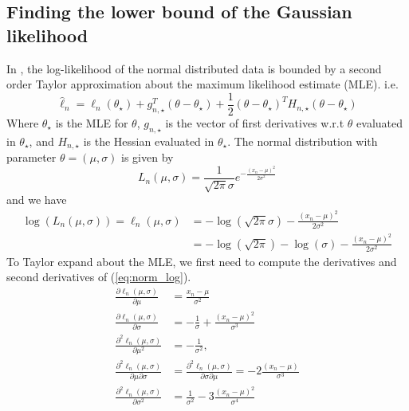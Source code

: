 \documentclass{article}
\theoremstyle{definition}
\begin{document}
\subsection{Finding the lower bound of the Gaussian likelihood}
In \cite{Bardenet:1}, the log-likelihood of the normal distributed data is bounded by a second order Taylor approximation about the maximum likelihood estimate (MLE). i.e. 
\begin{equation}
  \hat{\ell}_n = \ell_n(\theta_{\star} ) + g_{n,\star}^T\left(\theta - \theta_{\star}\right) + \frac{1}{2}\left(\theta - \theta_{\star}\right)^T H_{n, \star}\left(\theta - \theta_{\star}\right)
\end{equation}
Where $\theta_{\star}$ is the MLE for $\theta$, $g_{n,\star}$ is the vector of first derivatives w.r.t $\theta$ evaluated in $\theta_{\star}$, and $H_{n, \star}$ is the Hessian evaluated in $\theta_{\star}$. The normal distribution with parameter $\theta = (\mu, \sigma)$  is given by 
\begin{equation}
    L_n(\mu, \sigma) = \frac{1}{\sqrt{2\pi}\sigma}e^{-\frac{\left(x_n-\mu\right)^2}{2\sigma^2}}
\end{equation}
and we have 
\begin{equation}\label{eq:norm_log}
\begin{split}
    \log\left(L_n(\mu, \sigma)\right) = \ell_n(\mu, \sigma) &= -\log\left(\sqrt{2\pi}\sigma\right) - \frac{\left(x_n - \mu\right)^2}{2\sigma^2} \\
    &= - \log\left(\sqrt{2\pi}\right) - \log\left(\sigma\right) - \frac{\left(x_n-\mu\right)^2}{2\sigma^2}
\end{split}
\end{equation}
To Taylor expand about the MLE, we first need to compute the derivatives and second derivatives of (\ref{eq:norm_log}). 
\begin{equation}
    \begin{split}
    \frac{\partial \ell_n\left(\mu, \sigma\right)}{\partial \mu} &= \frac{x_n - \mu}{\sigma^2} 
    \\ \frac{\partial \ell_n\left(\mu, \sigma\right)}{\partial \sigma} &= -\frac{1}{\sigma}  + \frac{\left(x_n - \mu \right)^2}{\sigma^3}\\
    \frac{\partial^2\ell_n(\mu, \sigma)}{\partial \mu ^2} &= -\frac{1}{\sigma^2}, \\ 
    \frac{\partial^2 \ell_n(\mu, \sigma)}{\partial\mu\partial \sigma} &=  \frac{\partial^2 \ell_n(\mu, \sigma)}{\partial \sigma \partial \mu} = -2\frac{(x_n - \mu)}{\sigma^3} \\  \frac{\partial^2 \ell_n(\mu, \sigma)}{\partial \sigma^2} &= \frac{1}{\sigma^2} - 3\frac{(x_n - \mu)^2}{\sigma^4}
\end{split}
\end{equation}
\end{document}
